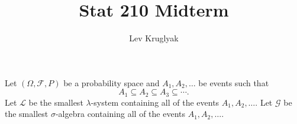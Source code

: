 \documentclass{pset}
\title{Stat 210 Midterm}
\author{Lev Kruglyak}
\begin{document}
\maketitle

%

\begin{problem}{1} Let $(\Omega, \mathcal{F}, P)$ be a probability space and $A_1,A_2,\dots$  be events such that
$$A_1 \subseteq A_2 \subseteq A_3 \subseteq \cdots.$$
Let $\mathcal{L}$ be the smallest $\lambda$-system containing all of the events $A_1,A_2,\dots$. Let $\mathcal{G}$ be the smallest $\sigma$-algebra containing all of the events $A_1,A_2,\dots$.
\end{problem}
\end{document}
